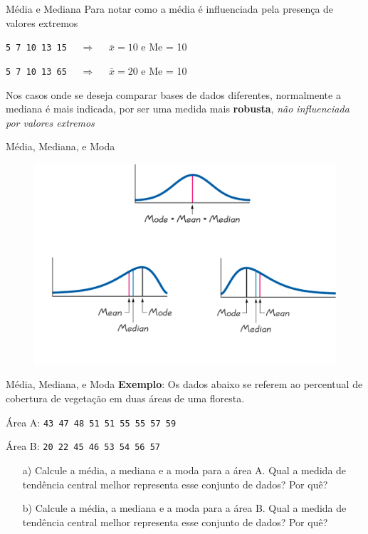 \documentclass[10pt]{beamer}\usepackage[]{graphicx}\usepackage[]{color}
\theoremstyle{definition}
\begin{document}
\begin{frame}{Média e Mediana}
  Para notar como a média é influenciada pela presença de valores
  extremos
  \begin{center}
    \texttt{5 7 10 13 15} $\quad \Rightarrow \quad $ $\bar{x} = 10$ e Me
    = 10
  \end{center}
    \begin{center}
    \texttt{5 7 10 13 65} $\quad \Rightarrow \quad $ $\bar{x} = 20$ e Me
    = 10
  \end{center}
  Nos casos onde se deseja comparar bases de dados diferentes,
  normalmente a mediana é mais indicada, por ser uma medida mais
  \textbf{robusta}, \textsl{não influenciada por valores extremos}
\end{frame}

\begin{frame}{Média, Mediana, e Moda}
  \begin{figure}[h]
    \centering
    \includegraphics[width=\textwidth]{../img/medidas-crop}
  \end{figure}
\end{frame}

\begin{frame}{Média, Mediana, e Moda}
  \textbf{Exemplo}: Os dados abaixo se referem ao percentual de
  cobertura de vegetação em duas áreas de uma floresta.
  \begin{flushleft}
    Área A: \texttt{43 47 48 51 51 55 55 57 59}
  \end{flushleft}
  \begin{flushleft}
    Área B: \texttt{20 22 45 46 53 54 56 57}
  \end{flushleft}
  \begin{itemize}
  \item[a)] Calcule a média, a mediana e a moda para a área A. Qual a
    medida de tendência central melhor representa esse conjunto de
    dados? Por quê?
    \item[b)] Calcule a média, a mediana e a moda para a área B. Qual a
      medida de tendência central melhor representa esse conjunto de
      dados? Por quê?
  \end{itemize}
\end{frame}
\end{document}
